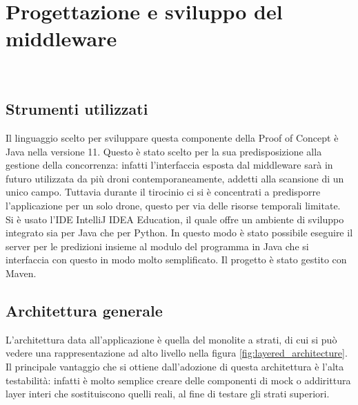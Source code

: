 
\chapter{Progettazione e sviluppo del middleware}
\label{cap:business-logic}

\\


\section{Strumenti utilizzati}
Il linguaggio scelto per sviluppare questa componente della Proof of Concept è Java nella versione 11.
Questo è stato scelto per la sua predisposizione alla gestione della concorrenza: infatti l'interfaccia esposta dal middleware sarà in futuro utilizzata da più droni contemporaneamente, addetti alla scansione di un unico campo. Tuttavia durante il tirocinio ci si è concentrati a predisporre l'applicazione per un solo drone, questo per via delle risorse temporali limitate.\\
Si è usato l'IDE IntelliJ IDEA Education, il quale offre un ambiente di sviluppo integrato sia per Java che per Python. In questo modo è stato possibile eseguire il server per le predizioni insieme al modulo del programma in Java che si interfaccia con questo in modo molto semplificato.
Il progetto è stato gestito con Maven.

\section{Architettura generale}
L'architettura data all'applicazione è quella del monolite a strati, di cui si può vedere una rappresentazione ad alto livello nella figura \ref{fig:layered_architecture}. Il principale vantaggio che si ottiene dall'adozione di questa architettura è l'alta testabilità: infatti è molto semplice creare delle componenti di mock o addirittura layer interi che sostituiscono quelli reali, al fine di testare gli strati superiori.
    
